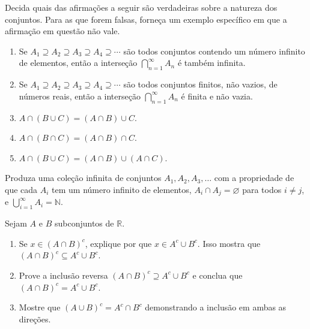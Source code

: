 \begin{exercise}\label{ex:verdadeiro-falso-conjuntos}
Decida quais das afirmações a seguir são verdadeiras sobre a natureza dos conjuntos. Para as que forem falsas, forneça um exemplo específico em que a afirmação em questão não vale.
\begin{enumerate}[label=\alph*)]
\item Se $A_{1} \supseteq A_{2} \supseteq A_{3} \supseteq A_{4} \supseteq \cdots$ são todos conjuntos contendo um número infinito de elementos, então a interseção $\bigcap_{n=1}^{\infty} A_{n}$ é também infinita.
\item Se $A_{1} \supseteq A_{2} \supseteq A_{3} \supseteq A_{4} \supseteq \cdots$ são todos conjuntos finitos, não vazios, de números reais, então a interseção $\bigcap_{n=1}^{\infty} A_{n}$ é finita e não vazia.
\item $A \cap (B \cup C) = (A \cap B) \cup C$.
\item $A \cap (B \cap C) = (A \cap B) \cap C$.
\item $A \cap (B \cup C) = (A \cap B) \cup (A \cap C)$.
\end{enumerate}
\end{exercise}

\begin{exercise}\label{ex:particao-infinita-de-N}
Produza uma coleção infinita de conjuntos $A_{1}, A_{2}, A_{3}, \ldots$ com a propriedade de que cada $A_{i}$ tem um número infinito de elementos, $A_{i} \cap A_{j} = \varnothing$ para todos $i \neq j$, e $\bigcup_{i=1}^{\infty} A_{i} = \mathbb{N}$.
\end{exercise}

\begin{exercise}\label{ex:de-morgan}
Sejam $A$ e $B$ subconjuntos de $\mathbb{R}$.
\begin{enumerate}[label=\alph*)]
\item Se $x \in (A \cap B)^{c}$, explique por que $x \in A^{c} \cup B^{c}$. Isso mostra que $(A \cap B)^{c} \subseteq A^{c} \cup B^{c}$.
\item Prove a inclusão reversa $(A \cap B)^{c} \supseteq A^{c} \cup B^{c}$ e conclua que $(A \cap B)^{c} = A^{c} \cup B^{c}$.
\item Mostre que $(A \cup B)^{c} = A^{c} \cap B^{c}$ demonstrando a inclusão em ambas as direções.
\end{enumerate}
\end{exercise}

